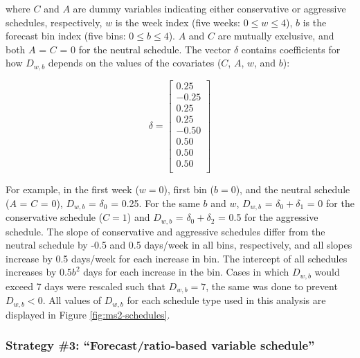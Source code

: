 \documentclass[12pt,]{book}
\theoremstyle{definition}
\theoremstyle{definition}
\theoremstyle{definition}
\theoremstyle{remark}
\begin{document}
\noindent
where \(C\) and \(A\) are dummy variables indicating either conservative
or aggressive schedules, respectively, \(w\) is the week index (five
weeks: \(0 \le w \le 4\)), \(b\) is the forecast bin index (five bins:
\(0 \le b \le 4\)). \(A\) and \(C\) are mutually exclusive, and both
\(A\) = \(C\) = 0 for the neutral schedule. The vector \(\delta\)
contains coefficients for how \(D_{w,b}\) depends on the values of the
covariates (\(C\), \(A\), \(w\), and \(b\)):

\[
\delta=
  \begin{bmatrix}
    0.25 \\
    -0.25 \\
    0.25 \\
    0.25 \\
    -0.50 \\
    0.50 \\
    0.50 \\
    0.50 \\
  \end{bmatrix}
\]

\noindent
For example, in the first week (\(w = 0\)), first bin (\(b = 0\)), and
the neutral schedule (\(A\) = \(C\) = 0), \(D_{w,b}\) = \(\delta_0\) =
0.25. For the same \(b\) and \(w\), \(D_{w,b}\) =
\(\delta_0 + \delta_1\) = 0 for the conservative schedule (\(C = 1\))
and \(D_{w,b}\) = \(\delta_0 + \delta_2\) = 0.5 for the aggressive
schedule. The slope of conservative and aggressive schedules differ from
the neutral schedule by -0.5 and 0.5 days/week in all bins,
respectively, and all slopes increase by 0.5 days/week for each increase
in bin. The intercept of all schedules increases by \(0.5b^2\) days for
each increase in the bin. Cases in which \(D_{w,b}\) would exceed 7 days
were rescaled such that \(D_{w,b} = 7\), the same was done to prevent
\(D_{w,b} < 0\). All values of \(D_{w,b}\) for each schedule type used
in this analysis are displayed in Figure \ref{fig:ms2-schedules}.

\subsubsection{\texorpdfstring{Strategy \#3: ``Forecast/ratio-based
variable
schedule''}{Strategy \#3: Forecast/ratio-based variable schedule}}\label{strategy-3-forecastratio-based-variable-schedule}
\end{document}
